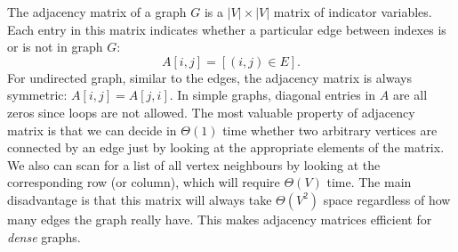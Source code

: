     The adjacency matrix of a graph $G$ is a $|V| \times |V|$ matrix of indicator variables. Each entry in this matrix indicates whether a particular edge between indexes is or is not in graph $G$:
    \begin{equation}
      A[i, j] = [(i, j) \in E] \mbox{.}
    \end{equation}
    For undirected graph, similar to the edges, the adjacency matrix is always symmetric: $A[i, j] = A[j, i]$. In simple graphs, diagonal entries in $A$ are all zeros since loops are not allowed. The most valuable property of adjacency matrix is that we can decide in $\Theta(1)$ time whether two arbitrary vertices are connected by an edge just by looking at the appropriate elements of the matrix. We also can scan for a list of all vertex neighbours by looking at the corresponding row (or column), which will require $\Theta(V)$ time. The main disadvantage is that this matrix will always take $\Theta(V^2)$ space regardless of how many edges the graph really have. This makes adjacency matrices efficient for \emph{dense} graphs.
